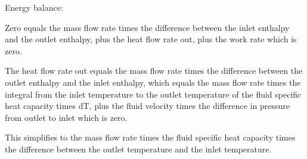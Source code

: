 Energy balance:

Zero equals the mass flow rate times the difference between the inlet enthalpy and the outlet enthalpy, plus the heat flow rate out, plus the work rate which is zero.

The heat flow rate out equals the mass flow rate times the difference between the outlet enthalpy and the inlet enthalpy, which equals the mass flow rate times the integral from the inlet temperature to the outlet temperature of the fluid specific heat capacity times dT, plus the fluid velocity times the difference in pressure from outlet to inlet which is zero.

This simplifies to the mass flow rate times the fluid specific heat capacity times the difference between the outlet temperature and the inlet temperature.